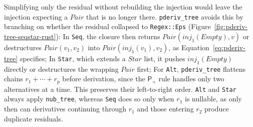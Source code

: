 Simplifying only the residual without rebuilding the injection
would leave the injection expecting a $\mathit{Pair}$ that is no longer there.
\texttt{pderiv\_tree}
avoids this by branching on whether the residual collapsed to \texttt{Regex::Eps}
(Figure~\ref{fig:pderiv-tree-seqstar-rust}):
In \texttt{Seq}, the closure then returns
$\mathit{Pair}(\mathit{inj}_1(\mathit{Empty}), v)$
or destructures $\mathit{Pair}(v_1, v_2)$ into $\mathit{Pair}(\mathit{inj}_1(v_1), v_2)$,
as Equation~\eqref{eq:pderiv-tree} specifies;
In \texttt{Star}, which extends a $\mathit{Star}$ list,
it pushes $\mathit{inj}_1(\mathit{Empty})$ directly
or destructures the wrapping $\mathit{Pair}$ first;
For \texttt{Alt}, \texttt{pderiv\_tree} flattens
chains $r_1 + \cdots + r_p$ before derivation,
since the $\mathsf{P}_{+}$ rule handles only
two alternatives at a time.
This preserves their left-to-right order.
\texttt{Alt} and \texttt{Star} always apply
\texttt{nub\_tree}, whereas \texttt{Seq}
does so only when $r_1$ is nullable,
as only then can derivatives continuing
through $r_1$ and those entering $r_2$
produce duplicate residuals.


